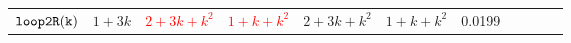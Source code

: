 {\begin {table}[t]
\begin{center}
{\begin{tabular}{ | >{\tiny}l | c | c | c | c | c | c | c | c | c  |c}
          {$\mathtt{loop2R(k)}$} &  $1+3k$ &  \textcolor{red}{$2 + 3k + k^2$} &  \textcolor{red}{$1 + k + k^2$}  &  $2 + 3k + k^2$ &  $1 + k + k^2$ & 0.0199 \\ %

\end{tabular}}
\end{center}
\end{table}}
